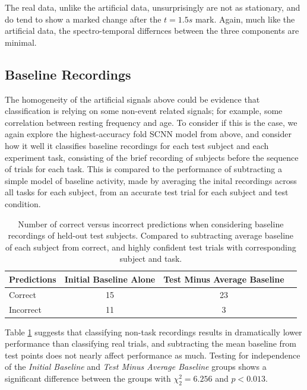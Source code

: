 \documentclass[fleqn,10pt]{wlscirep}
\begin{document}
The real data, unlike the artificial data, unsurprisingly are not as stationary, and do tend to show a marked change after the $t=1.5s$ mark. Again, much like the artificial data, the spectro-temporal differnces between the three components are minimal.

\subsection*{Baseline Recordings}

The homogeneity of the artificial signals above could be evidence that classification is relying on some non-event related signals; for example, some correlation between resting frequency and age. To consider if this is the case, we again explore the highest-accuracy fold SCNN model from above, and consider how it well it classifies baseline recordings for each test subject and each experiment task, consisting of the brief recording of subjects before the sequence of trials for each task. This is compared to the performance of subtracting a simple model of baseline activity, made by averaging the inital recordings across all tasks for each subject, from an accurate test trial for each subject and test condition.

\begin{table}[h]
 \caption{Number of correct versus incorrect predictions when considering baseline recordings of held-out test subjects. Compared to subtracting average baseline of each subject from correct, and highly confident test trials with corresponding subject and task.}
 \centering
 \begin{tabular}{l | c | c | c}
   \toprule
   \textbf{Predictions} &  \textbf{Initial Baseline Alone} & \textbf{Test Minus Average Baseline} \\
   \toprule
                        Correct           & 15 & 23  \\
                        Incorrect         & 11 &  3  \\ 
   \bottomrule
 \end{tabular}
 \label{tab:rest_performance3}
\end{table}

Table \ref{tab:rest_performance3} suggests that classifying non-task recordings results in dramatically lower performance than classifying real trials, and subtracting the mean baseline from test points does not nearly affect performance as much. Testing for independence of the {\em Initial Baseline} and {\em Test Minus Average Baseline} groups shows a significant difference between the groups with $\chi^2_{2}=6.256$ and $p<0.013$.
\end{document}
